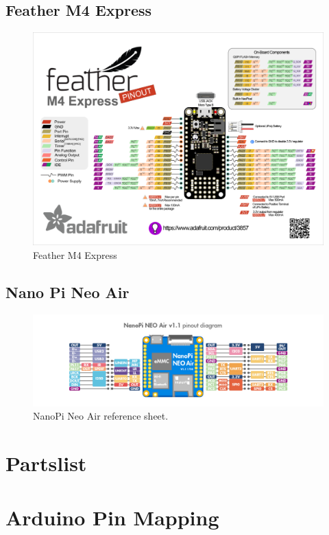 \documentclass{article}
\begin{document}
\subsection{Feather M4 Express}
\begin{figure}[H]
    \centering
    \includegraphics[width=\textwidth]{images/featherm4pinout.png}
    \caption{Feather M4 Express}
    \label{fig:teensy-front}
\end{figure}

\subsection{Nano Pi Neo Air}
\begin{figure}[H]
    \centering
    \includegraphics[width=\textwidth]{images/neo air pinout.jpeg}
    \caption{NanoPi Neo Air reference sheet.}
    \label{fig:trinket-m0}
\end{figure}


\section{Partslist}
\label{app:partslist}


\newpage
\section{Arduino Pin Mapping}
\label{app:pinmap}


%
%
\end{document}
